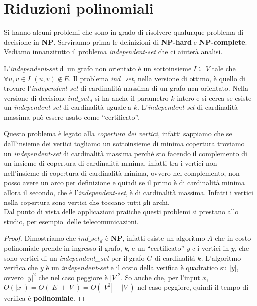 \documentclass[a4paper,12pt, oneside]{book}
\begin{document}
\section{Riduzioni polinomiali}
Si hanno alcuni problemi che sono in grado di risolvere qualunque problema di
decisione in \textbf{NP}. Serviranno prima le definizioni di \textbf{NP-hard} e
\textbf{NP-complete}.\\
Vediamo innanzitutto il problema \textit{independent-set} che ci aiuterà
analisi.
\begin{definizione}
  L'\textit{independent-set } di un grafo non orientato è un sottoinsieme
  $I\subseteq V$ tale che $\forall u,v\in I$ $(u,v)\not\in E$. Il problema
  \textit{ind\_set}, nella versione di ottimo, è quello di trovare
  l'\textit{independent-set} di cardinalità massima di un grafo non
  orientato. Nella versione di decisione $ind\_set_d$ si ha anche il parametro
  $k$ intero e si cerca se esiste un \textit{independent-set} di cardinalità
  uguale a $k$. L'\textit{independent-set} di cardinalità massima può essere
  usato come ``certificato''.
\end{definizione}
Questo problema è legato alla \textit{copertura dei vertici}, infatti sappiamo
che se dall'insieme dei vertici togliamo un sottoinsieme di minima copertura
troviamo un \textit{independent-set} di cardinalità massima perché sto facendo
il complemento di un insieme di copertura di cardinalità minima, infatti tra i
vertici non nell'insieme di copertura di cardinalità minima, ovvero nel
complemento, non posso avere un arco per definizione e quindi se il primo è di
cardinalità minima allora il secondo, che è l'\textit{independent-set}, è di
cardinalità massima. Infatti i vertici nella copertura sono vertici che toccano
tutti gli archi.\\
Dal punto di vista delle applicazioni pratiche questi problemi si prestano allo
studio, per esempio, delle telecomunicazioni.
\begin{proof}
  Dimostriamo che $ind\_set_d$ è \textbf{NP}, infatti esiste un algoritmo $A$
  che in costo polinomiale prende in ingresso il grafo, $k$, e un
  ``certificato'' $y$ e i vertici in $y$, che sono vertici di un
  \textit{independent\_set} per il grafo $G$ di cardinalità $k$. L'algoritmo
  verifica che $y$ è un \textit{independent-set} e il costo della verifica è
  quadratico su $|y|$, ovvero $|y|^2$ che nel caso peggiore è $|V|^2$. So anche
  che, per l'input $x$, $O(|x|)=O(|E|+|V|)=O(|V^2|+|V|)$ nel caso peggiore,
  quindi il tempo di verifica è \textbf{polinomiale}.
\end{proof}
\end{document}

